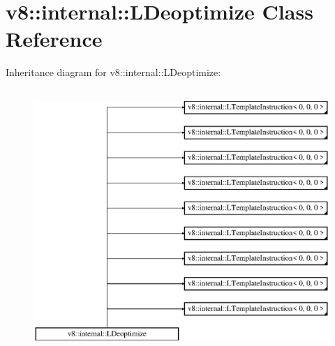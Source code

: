 \hypertarget{classv8_1_1internal_1_1_l_deoptimize}{}\section{v8\+:\+:internal\+:\+:L\+Deoptimize Class Reference}
\label{classv8_1_1internal_1_1_l_deoptimize}
Inheritance diagram for v8\+:\+:internal\+:\+:L\+Deoptimize\+:\begin{figure}[H]
\begin{center}
\leavevmode
\includegraphics[height=10.000000cm]{classv8_1_1internal_1_1_l_deoptimize}
\end{center}
\end{figure}
